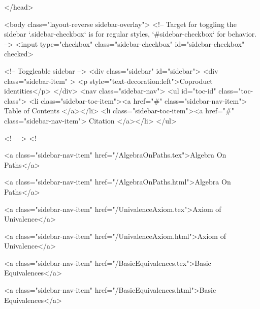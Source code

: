   
</head>




  <body class="layout-reverse sidebar-overlay">
    <!-- Target for toggling the sidebar `.sidebar-checkbox` is for regular
     styles, `#sidebar-checkbox` for behavior. -->
<input type="checkbox" class="sidebar-checkbox" id="sidebar-checkbox" checked>

<!-- Toggleable sidebar -->
<div class="sidebar" id="sidebar">
  <div class="sidebar-item" >
    <p style="text-decoration:left">Coproduct identities</p>
  </div>
  <nav class="sidebar-nav">
    <ul id="toc-id" class="toc-class">
  <li class="sidebar-toc-item"><a href="#" class="sidebar-nav-item"> Table of Contents </a></li>
  <li class="sidebar-toc-item"><a href="#" class="sidebar-nav-item"> Citation </a></li>
</ul>


    <!--  -->
    <!-- 
      
    
      
    
      
    
      
    
      
        
      
    
      
        
          <a class="sidebar-nav-item" href="/AlgebraOnPaths.tex">Algebra On Paths</a>
        
      
    
      
        
          <a class="sidebar-nav-item" href="/AlgebraOnPaths.html">Algebra On Paths</a>
        
      
    
      
        
          <a class="sidebar-nav-item" href="/UnivalenceAxiom.tex">Axiom of Univalence</a>
        
      
    
      
        
          <a class="sidebar-nav-item" href="/UnivalenceAxiom.html">Axiom of Univalence</a>
        
      
    
      
        
          <a class="sidebar-nav-item" href="/BasicEquivalences.tex">Basic Equivalences</a>
        
      
    
      
        
          <a class="sidebar-nav-item" href="/BasicEquivalences.html">Basic Equivalences</a>
        
